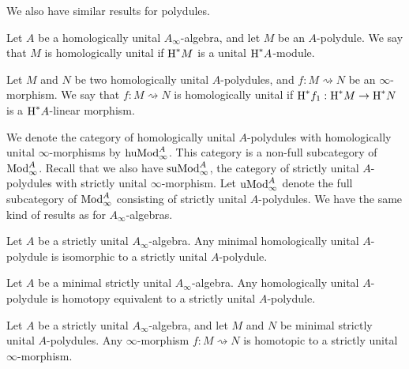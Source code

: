 \documentclass[../thesis.tex]{subfiles}
\begin{document}
            We also have similar results for polydules.

            \begin{definition}
                Let $A$ be a homologically unital $A_\infty$-algebra, and let $M$ be an $A$-polydule. We say that $M$ is homologically unital if $\tt{H}^*M$ is a unital $\tt{H}^*A$-module.

                Let $M$ and $N$ be two homologically unital $A$-polydules, and $f : M \rightsquigarrow N$ be an $\infty$-morphism. We say that $f : M \rightsquigarrow N$ is homologically unital if $\tt{H}^*f_1 : \tt{H}^*M \rightarrow \tt{H}^*N$ is a $\tt{H}^*A$-linear morphism.
            \end{definition}

            We denote the category of homologically unital $A$-polydules with homologically unital $\infty$-morphisms by $\tt{huMod}_\infty^A$. This category is a non-full subcategory of $\tt{Mod}_\infty^A$. Recall that we also have $\tt{suMod}_\infty^A$, the category of strictly unital $A$-polydules with strictly unital $\infty$-morphism. Let $\tt{uMod}_\infty^A$ denote the full subcategory of $\tt{Mod}_\infty^A$ consisting of strictly unital $A$-polydules. We have the same kind of results as for $A_\infty$-algebras.

            \begin{thm}\label{thm: unit-strict-poly}
                Let $A$ be a strictly unital $A_\infty$-algebra. Any minimal homologically unital $A$-polydule is isomorphic to a strictly unital $A$-polydule.
            \end{thm}

            \begin{corollary}\label{cor: unit-strict-poly}
                Let $A$ be a minimal strictly unital $A_\infty$-algebra. Any homologically unital $A$-polydule is homotopy equivalent to a strictly unital $A$-polydule.
            \end{corollary}

            \begin{thm}
                Let $A$ be a strictly unital $A_\infty$-algebra, and let $M$ and $N$ be minimal strictly unital $A$-polydules. Any $\infty$-morphism $f: M \rightsquigarrow N$ is homotopic to a strictly unital $\infty$-morphism.
            \end{thm}
\end{document}
